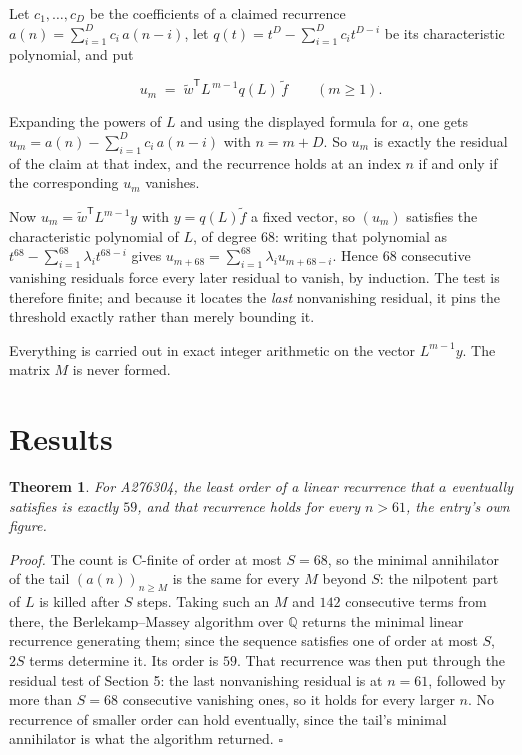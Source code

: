 \documentclass[11pt]{article}
\newtheorem{theorem}{Theorem}
\theoremstyle{definition}
\begin{document}
Let $c_1,\dots,c_D$ be the coefficients of a claimed recurrence $a(n) = \sum_{i=1}^{D} c_i\,a(n-i)$, let $q(t) = t^{D} - \sum_{i=1}^{D} c_i t^{D-i}$ be its characteristic polynomial, and put

\[u_m \;=\; \tilde w^{\mathsf T} L^{\,m-1} q(L)\,\tilde f \qquad (m \ge 1).\]

Expanding the powers of $L$ and using the displayed formula for $a$, one gets $u_m = a(n) - \sum_{i=1}^{D} c_i\,a(n-i)$ with $n = m + D$. So $u_m$ is exactly the residual of the claim at that index, and the recurrence holds at an index $n$ if and only if the corresponding $u_m$ vanishes.

Now $u_m = \tilde w^{\mathsf T} L^{m-1} y$ with $y = q(L)\tilde f$ a fixed vector, so $(u_m)$ satisfies the characteristic polynomial of $L$, of degree $68$: writing that polynomial as $t^{68} - \sum_{i=1}^{68} \lambda_i t^{68-i}$ gives $u_{m+68} = \sum_{i=1}^{68} \lambda_i u_{m+68-i}$. Hence $68$ consecutive vanishing residuals force every later residual to vanish, by induction. The test is therefore finite; and because it locates the {\itshape last} nonvanishing residual, it pins the threshold exactly rather than merely bounding it.

Everything is carried out in exact integer arithmetic on the vector $L^{m-1}y$. The matrix $M$ is never formed.

\section{Results}

\begin{theorem} For A276304, the least order of a linear recurrence that $a$ eventually satisfies is exactly $59$, and that recurrence holds for every $n > 61$, the entry's own figure.\end{theorem}

{\itshape Proof.} The count is C-finite of order at most $S = 68$, so the minimal annihilator of the tail $(a(n))_{n \ge M}$ is the same for every $M$ beyond $S$: the nilpotent part of $L$ is killed after $S$ steps. Taking such an $M$ and $142$ consecutive terms from there, the Berlekamp--Massey algorithm over $\mathbb{Q}$ returns the minimal linear recurrence generating them; since the sequence satisfies one of order at most $S$, $2S$ terms determine it. Its order is $59$. That recurrence was then put through the residual test of Section 5: the last nonvanishing residual is at $n = 61$, followed by more than $S = 68$ consecutive vanishing ones, so it holds for every larger $n$. No recurrence of smaller order can hold eventually, since the tail's minimal annihilator is what the algorithm returned. $\square$
\end{document}
